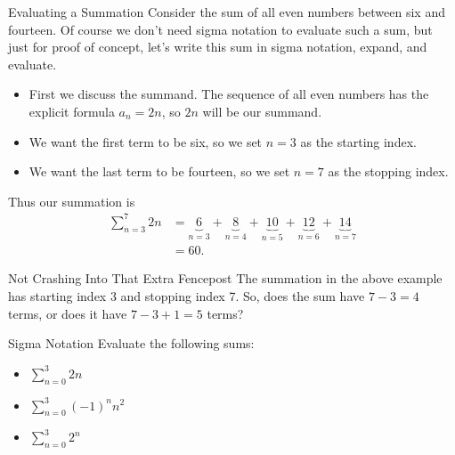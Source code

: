 \begin{example}{Evaluating a Summation}
Consider the sum of all even numbers between six and fourteen.  Of course we don't need sigma notation to evaluate such a sum, but just for proof of  concept, let's write this sum in sigma notation, expand, and evaluate. 
\begin{itemize}
\item First we discuss the summand.  The sequence of all even numbers has the explicit formula $a_n=2n$, so $2n$ will be our summand.
\item We want the first term to be six, so we set $n=3$ as the starting index. 
\item We want the last term to be fourteen, so we set $n=7$ as the stopping index.

\end{itemize}

Thus our summation is 
\begin{align*}
\sum_{n=3}^{7}2n &= \underset{n=3}{\underbrace{6}}+\underset{n=4}{\underbrace{8}}+\underset{n=5}{\underbrace{10}}+\underset{n=6}{\underbrace{12}}+\underset{n=7}{\underbrace{14}} \\
 &= 60.
\end{align*}

\end{example}

\begin{exercise}{Not Crashing Into That Extra Fencepost \Coffeecup}
The summation in the above example has starting index 3 and stopping index 7.  So, does the sum have $7-3=4$ terms, or does it have $7-3+1=5$ terms?

\end{exercise}


\begin{exercise}{Sigma Notation \Coffeecup}
Evaluate the following sums:
\begin{itemize}
\item $\sum\limits_{n=0}^{3} 2n $
\item $\sum\limits_{n=0}^{3} (-1)^nn^2 $
\item $\sum\limits_{n=0}^{3} 2^n $
\end{itemize}
\end{exercise}

